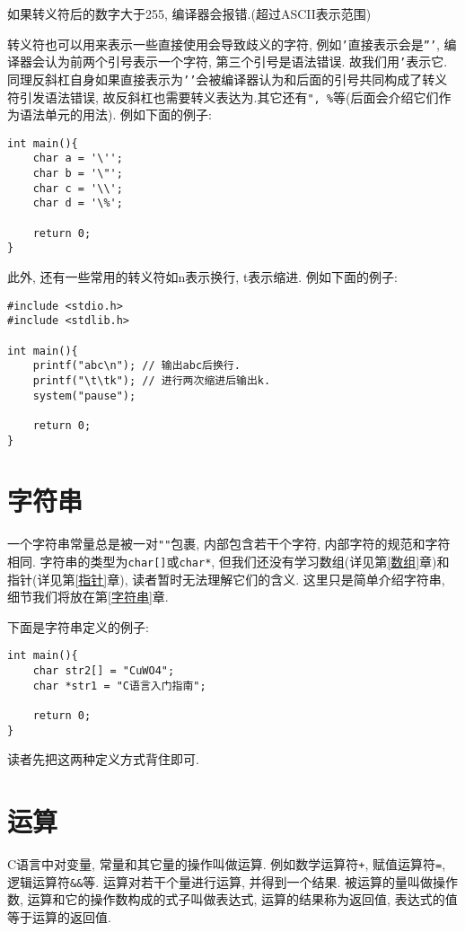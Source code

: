         如果转义符后的数字大于255, 编译器会报错.(超过ASCII表示范围)

        转义符也可以用来表示一些直接使用会导致歧义的字符, 例如\texttt{'}直接表示会是\texttt{'''}, 编译器会认为前两个引号表示一个字符, 第三个引号是语法错误. 故我们用\texttt{\sla'}表示它. 同理反斜杠自身如果直接表示为\texttt{'\sla'}会被编译器认为和后面的引号共同构成了转义符引发语法错误, 故反斜杠也需要转义表达为\texttt{\sla\sla}.其它还有\texttt{\sla", \sla\%}等(后面会介绍它们作为语法单元的用法). 例如下面的例子:
\begin{lstlisting}
int main(){
    char a = '\'';
    char b = '\"';
    char c = '\\';
    char d = '\%';

    return 0;
}
\end{lstlisting}

        此外, 还有一些常用的转义符如\sla n表示换行, \sla t表示缩进. 例如下面的例子:
\begin{lstlisting}
#include <stdio.h>
#include <stdlib.h>

int main(){
    printf("abc\n"); // 输出abc后换行.
    printf("\t\tk"); // 进行两次缩进后输出k.
    system("pause");

    return 0;
}
\end{lstlisting}

    \section{字符串}
        一个字符串常量总是被一对\texttt{""}包裹, 内部包含若干个字符, 内部字符的规范和字符相同. 字符串的类型为\texttt{char[]}或\texttt{char*}, 但我们还没有学习数组(详见第\ref{数组}章)和指针(详见第\ref{指针}章), 读者暂时无法理解它们的含义. 这里只是简单介绍字符串, 细节我们将放在第\ref{字符串}章.

        下面是字符串定义的例子:
\begin{lstlisting}
int main(){
    char str2[] = "CuWO4";
    char *str1 = "C语言入门指南";

    return 0;
}
\end{lstlisting}

        读者先把这两种定义方式背住即可.

    \section{运算} \label{运算}
        C语言中对变量, 常量和其它量的操作叫做运算. 例如数学运算符\texttt{+}, 赋值运算符\texttt{=}, 逻辑运算符\texttt{\&\&}等. 运算对若干个量进行运算, 并得到一个结果. 被运算的量叫做操作数, 运算和它的操作数构成的式子叫做表达式, 运算的结果称为返回值, 表达式的值等于运算的返回值.

